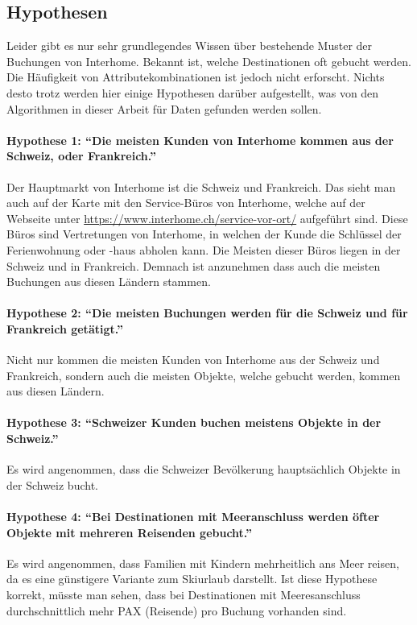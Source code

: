 \subsection{Hypothesen}
\label{sec:einleitung:ziel:hypothesen}
Leider gibt es nur sehr grundlegendes Wissen über bestehende Muster der Buchungen von Interhome. Bekannt ist, welche Destinationen oft gebucht werden. Die Häufigkeit von Attributekombinationen ist jedoch nicht erforscht. Nichts desto trotz werden hier einige Hypothesen darüber aufgestellt, was von den Algorithmen in dieser Arbeit für Daten gefunden werden sollen.

\paragraph{Hypothese 1: "`Die meisten Kunden von Interhome kommen aus der Schweiz, oder Frankreich."'} Der Hauptmarkt von Interhome ist die Schweiz und Frankreich. Das sieht man auch auf der Karte mit den Service-Büros von Interhome, welche auf der Webseite unter \url{https://www.interhome.ch/service-vor-ort/} aufgeführt sind. Diese Büros sind Vertretungen von Interhome, in welchen der Kunde die Schlüssel der Ferienwohnung oder -haus abholen kann. Die Meisten dieser Büros liegen in der Schweiz und in Frankreich. Demnach ist anzunehmen dass auch die meisten Buchungen aus diesen Ländern stammen.
\paragraph{Hypothese 2: "`Die meisten Buchungen werden für die Schweiz und für Frankreich getätigt."'} Nicht nur kommen die meisten Kunden von Interhome aus der Schweiz und Frankreich, sondern auch die meisten Objekte, welche gebucht werden, kommen aus diesen Ländern.
\paragraph{Hypothese 3: "`Schweizer Kunden buchen meistens Objekte in der Schweiz."'} Es wird angenommen, dass die Schweizer Bevölkerung hauptsächlich Objekte in der Schweiz bucht.
\paragraph{Hypothese 4: "`Bei Destinationen mit Meeranschluss werden öfter Objekte mit mehreren Reisenden gebucht."'} Es wird angenommen, dass Familien mit Kindern mehrheitlich ans Meer reisen, da es eine günstigere Variante zum Skiurlaub darstellt. Ist diese Hypothese korrekt, müsste man sehen, dass bei Destinationen mit Meeresanschluss durchschnittlich mehr PAX (Reisende) pro Buchung vorhanden sind.
